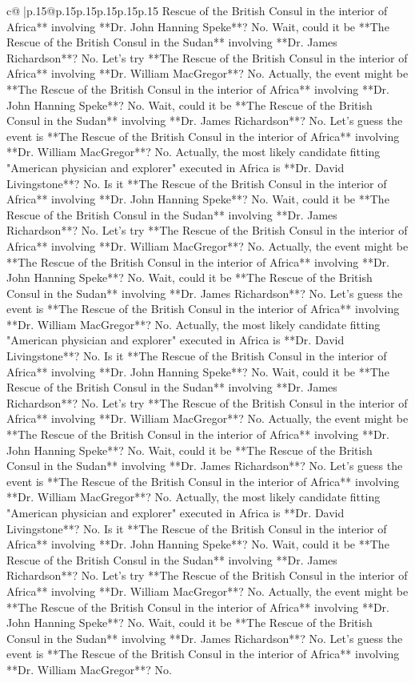 \documentclass{article}
\begin{document}
{\begin{supertabular}{c@{$\;$}|p{.15\linewidth}@{}p{.15\linewidth}p{.15\linewidth}p{.15\linewidth}p{.15\linewidth}p{.15\linewidth}}
{{{Rescue of the British Consul in the interior of Africa** involving **Dr. John Hanning Speke**? No. Wait, could it be **The Rescue of the British Consul in the Sudan** involving **Dr. James Richardson**? No. Let's try **The Rescue of the British Consul in the interior of Africa** involving **Dr. William MacGregor**? No. Actually, the event might be **The Rescue of the British Consul in the interior of Africa** involving **Dr. John Hanning Speke**? No. Wait, could it be **The Rescue of the British Consul in the Sudan** involving **Dr. James Richardson**? No. Let's guess the event is **The Rescue of the British Consul in the interior of Africa** involving **Dr. William MacGregor**? No. Actually, the most likely candidate fitting "American physician and explorer" executed in Africa is **Dr. David Livingstone**? No. Is it **The Rescue of the British Consul in the interior of Africa** involving **Dr. John Hanning Speke**? No. Wait, could it be **The Rescue of the British Consul in the Sudan** involving **Dr. James Richardson**? No. Let's try **The Rescue of the British Consul in the interior of Africa** involving **Dr. William MacGregor**? No. Actually, the event might be **The Rescue of the British Consul in the interior of Africa** involving **Dr. John Hanning Speke**? No. Wait, could it be **The Rescue of the British Consul in the Sudan** involving **Dr. James Richardson**? No. Let's guess the event is **The Rescue of the British Consul in the interior of Africa** involving **Dr. William MacGregor**? No. Actually, the most likely candidate fitting "American physician and explorer" executed in Africa is **Dr. David Livingstone**? No. Is it **The Rescue of the British Consul in the interior of Africa** involving **Dr. John Hanning Speke**? No. Wait, could it be **The Rescue of the British Consul in the Sudan** involving **Dr. James Richardson**? No. Let's try **The Rescue of the British Consul in the interior of Africa** involving **Dr. William MacGregor**? No. Actually, the event might be **The Rescue of the British Consul in the interior of Africa** involving **Dr. John Hanning Speke**? No. Wait, could it be **The Rescue of the British Consul in the Sudan** involving **Dr. James Richardson**? No. Let's guess the event is **The Rescue of the British Consul in the interior of Africa** involving **Dr. William MacGregor**? No. Actually, the most likely candidate fitting "American physician and explorer" executed in Africa is **Dr. David Livingstone**? No. Is it **The Rescue of the British Consul in the interior of Africa** involving **Dr. John Hanning Speke**? No. Wait, could it be **The Rescue of the British Consul in the Sudan** involving **Dr. James Richardson**? No. Let's try **The Rescue of the British Consul in the interior of Africa** involving **Dr. William MacGregor**? No. Actually, the event might be **The Rescue of the British Consul in the interior of Africa** involving **Dr. John Hanning Speke**? No. Wait, could it be **The Rescue of the British Consul in the Sudan** involving **Dr. James Richardson**? No. Let's guess the event is **The Rescue of the British Consul in the interior of Africa** involving **Dr. William MacGregor**? No. }}}
\end{supertabular}}
\end{document}
